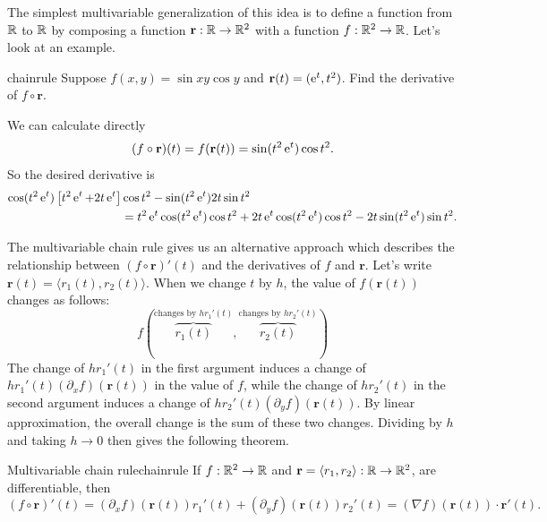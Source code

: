 \documentclass{watsonbook}
\begin{document}
  The simplest multivariable generalization of this idea is to define a
  function from $\mathbb{R}$ to $\mathbb{R}$ by composing a function $\mathbf{r}: \mathbb{R}
  \to \mathbb{R}^2$
  with a function $f: \mathbb{R}^2 \to \mathbb{R}$. Let's look at an example.

  \begin{example}{}{chainrule}
    Suppose $f(x,y) = \sin xy \cos y$ and $\mathbf{r}(t) = (\operatorname{e}^t,
    t^2)$. Find the derivative of $f \circ \mathbf{r}$. 
  \end{example}

  \begin{solution}
    We can calculate directly
    \[
      (f \circ \mathbf{r})(t) = f(\mathbf{r}(t)) = \sin (t^2\operatorname{e}^t) \cos
      t^2. 
    \]
    So the desired derivative is
    \begin{align*}
      \cos(t^2\operatorname{e}^t)\left[ t^2 \operatorname{e}^t + 2t\operatorname{e}^t\right] &\cos t^2  -
      \sin(t^2 \operatorname{e}^t) 2t \sin t^2  \\ &=
      t^2 \operatorname{e}^t \cos(t^2 \operatorname{e}^t) \cos t^2 + 2t\operatorname{e}^t \cos(t^2 \operatorname{e}^t) \cos t^2 -
      2t\sin(t^2 \operatorname{e}^t) \sin t^2. 
    \end{align*}
  \end{solution}

  The multivariable chain rule gives us an alternative approach which
  describes the relationship between $(f\circ \mathbf{r})'(t)$ and the
  derivatives of $f$ and $\mathbf{r}$. Let's write
  $\mathbf{r}(t) = \langle r_1(t), r_2(t) \rangle$.  When we change
  $t$ by $h$, the value of $f(\mathbf{r}(t))$ changes as follows: 
  \[
    f\left(
      \overbrace{r_1(t)}^{\text{changes by $hr_1'(t)$}},
      \overbrace{r_2(t)}^{\text{changes by $hr_2'(t)$}}
    \right)
  \]
  The change of $hr_1'(t)$ in the first argument induces a change of
  $hr_1'(t) (\partial_xf)(\mathbf{r}(t))$ in the value of $f$, while
  the change of $hr_2'(t)$ in the second argument induces a change of
  $hr_2'(t) (\partial_yf)(\mathbf{r}(t))$. By linear approximation,
  the overall change is the sum of these two changes. Dividing by $h$
  and taking $h \to 0$ then gives the following theorem.
  
  \begin{theo}{Multivariable chain rule}{chainrule}
    If $f : \mathbb{R}^2 \to \mathbb{R}$ and $\mathbf{r} = \langle r_1,  r_2\rangle :
    \mathbb{R} \to \mathbb{R}^2$,
    are differentiable, then
    \begin{equation} \label{eq:chainrule} 
      (f\circ \mathbf{r})'(t) = (\partial_x f)(\mathbf{r}(t))r_1'(t) +
      (\partial_y f)(\mathbf{r}(t))r_2'(t) = (\nabla f)(\mathbf{r}(t))
      \cdot \mathbf{r}'(t). 
    \end{equation}
  \end{theo}
\end{document}
